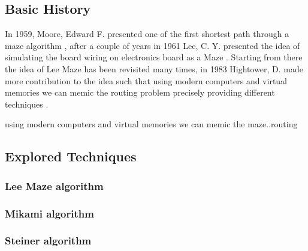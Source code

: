 \subsection{Basic History}
    In 1959, Moore, Edward F. presented one of the first shortest path through a maze algorithm
    \cite{MooreRef}, after a couple of years in 1961 Lee, C. Y. presented the idea of simulating the 
    board wiring on electronics board as a Maze \cite{LeeRef}. Starting from there the idea of Lee Maze
    has been revisited many times, in 1983 Hightower, D. made more contribution to the idea such that
    using modern computers and virtual memories we can memic the routing problem precisely providing 
    different techniques \cite{HightowerRef}.

    



    using modern computers and virtual memories we can memic the maze..routing


\subsection{Explored Techniques}
    \subsubsection{Lee Maze algorithm}
    \subsubsection{Mikami algorithm}
    \subsubsection{Steiner algorithm}
    
